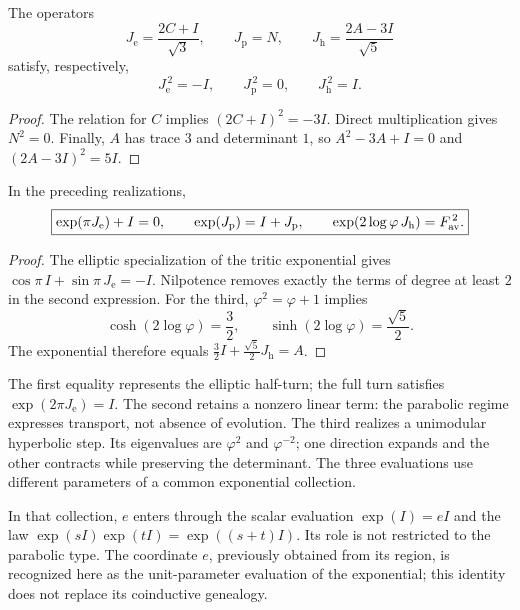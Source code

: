 \begin{proposition}
\label{geo-euler-trit-generadores}
The operators
\[
 J_{\mathrm e}=\frac{2C+I}{\sqrt3},\qquad
 J_{\mathrm p}=N,\qquad
 J_{\mathrm h}=\frac{2A-3I}{\sqrt5}
\]
satisfy, respectively,
\[
 J_{\mathrm e}^{\,2}=-I,\qquad
 J_{\mathrm p}^{\,2}=0,\qquad
 J_{\mathrm h}^{\,2}=I.
\]
\end{proposition}
\begin{proof}
The relation for \(C\) implies \((2C+I)^2=-3I\).
Direct multiplication gives \(N^2=0\).
Finally, \(A\) has trace \(3\) and determinant \(1\), so
\(A^2-3A+I=0\) and \((2A-3I)^2=5I\).
\end{proof}

\begin{proposition}
\label{geo-euler-trit-evaluaciones}
In the preceding realizations,
\begin{equation}
 \boxed{
 \exp(\pi J_{\mathrm e})+I=0,\qquad
 \exp(J_{\mathrm p})=I+J_{\mathrm p},\qquad
 \exp(2\log\varphi\,J_{\mathrm h})=F_{\rm av}^{\,2}.}
 \label{geo-euler-trit-tres-evaluaciones}
\end{equation}
\end{proposition}
\begin{proof}
The elliptic specialization of the tritic exponential gives
\(\cos\pi\,I+\sin\pi\,J_{\mathrm e}=-I\).
Nilpotence removes exactly the terms of degree at least \(2\)
in the second expression. For the third, \(\varphi^2=\varphi+1\) implies
\[
 \cosh(2\log\varphi)=\frac32,\qquad
 \sinh(2\log\varphi)=\frac{\sqrt5}{2}.
\]
The exponential therefore equals
\(\frac32I+\frac{\sqrt5}{2}J_{\mathrm h}=A\).
\end{proof}

The first equality represents the elliptic half-turn; the full turn
satisfies \(\exp(2\pi J_{\mathrm e})=I\). The second retains a nonzero
linear term: the parabolic regime expresses transport, not absence of
evolution. The third realizes a unimodular hyperbolic step. Its
eigenvalues are \(\varphi^2\) and \(\varphi^{-2}\); one direction expands and
the other contracts while preserving the determinant. The three evaluations
use different parameters of a common exponential collection.

In that collection, \(e\) enters through the scalar evaluation
\(\exp(I)=eI\) and the law \(\exp(sI)\exp(tI)=\exp((s+t)I)\).
Its role is not restricted to the parabolic type. The coordinate \(e\), previously
obtained from its region, is recognized here as the unit-parameter evaluation
of the exponential; this identity does not replace its coinductive genealogy.

